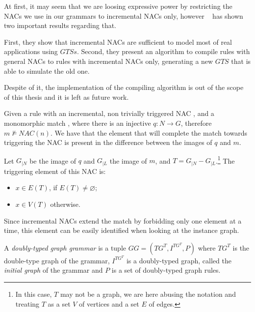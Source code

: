 At first, it may seem that we are loosing expressive power by restricting the NACs we use in our grammars to incremental NACs only, however ~\cite{Corradini2013} has shown two important results regarding that.

First, they show that incremental NACs are sufficient to model most of real applications using $GTSs$. Second, they present an algorithm to compile rules with general NACs to rules with incremental NACs only, generating a new $GTS$ that is able to simulate the old one.

Despite of it, the implementation of the compiling algorithm is out of the scope of this thesis and it is left as future work.

\begin{definition} Given a rule \graphrule{} with an incremental, non trivially triggered NAC \nac{}, and a monomorphic match \match{}, where there is an injective $q : N \rightarrow G$, therefore $m \not\models NAC(n)$. We have that the element that will complete the match towards triggering the NAC is present in the difference between the images of $q$ and $m$.

  Let $G_{|N}$ be the image of $q$ and $G_{|L}$ the image of $m$, and \mbox{$T = G_{|N} - G_{|L}$}.\footnote{In this case, $T$ may not be a graph, we are here abusing the notation and treating $T$ as a set $V$ of vertices and a set $E$ of edges.} The triggering element of this NAC is:

  \begin{itemize}
    \item $x \in E(T)$, if $E(T) \neq \varnothing$;
    \item $x \in V(T)$ otherwise.
  \end{itemize} 
\end{definition}

\begin{example}
Since incremental NACs extend the match by forbidding only one element at a time, this element can be easily identified when looking at the instance graph.
\end{example}

\begin{definition} A \emph{doubly-typed graph grammar} is a tuple $GG = \left(TG^T, I^{TG^T},P \right)$ where $TG^T$ is the double-type graph of the grammar, $I^{TG^T}$ is a doubly-typed graph, called the \emph{initial graph} of the grammar and $P$ is a set of doubly-typed graph rules.
\end{definition}

